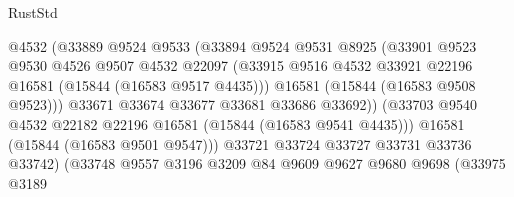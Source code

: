 \begin{lexlean}{RustStd}
\begin{coremodule}
                                    @4532
                                    (@33889
                                      @9524
                                      @9533
                                      (@33894
                                        @9524
                                        @9531
                                        @8925
                                        (@33901
                                          @9523
                                          @9530
                                          @4526
                                          @9507
                                          @4532
                                          @22097
                                          (@33915
                                            @9516
                                            @4532
                                            @33921
                                            @22196
                                            @16581
                                            (@15844 (@16583 @9517 @4435)))
                                          @16581
                                          (@15844 (@16583 @9508 @9523)))
                                        @33671
                                        @33674
                                        @33677
                                        @33681
                                        @33686
                                        @33692))
                                    (@33703
                                      @9540
                                      @4532
                                      @22182
                                      @22196
                                      @16581
                                      (@15844 (@16583 @9541 @4435)))
                                    @16581
                                    (@15844 (@16583 @9501 @9547)))
                                  @33721
                                  @33724
                                  @33727
                                  @33731
                                  @33736
                                  @33742)
                                (@33748
                                  @9557
                                  @3196
                                  @3209
                                  @84
                                  @9609
                                  @9627
                                  @9680
                                  @9698
                                  (@33975
                                    @3189

\end{coremodule}
\end{lexlean}
